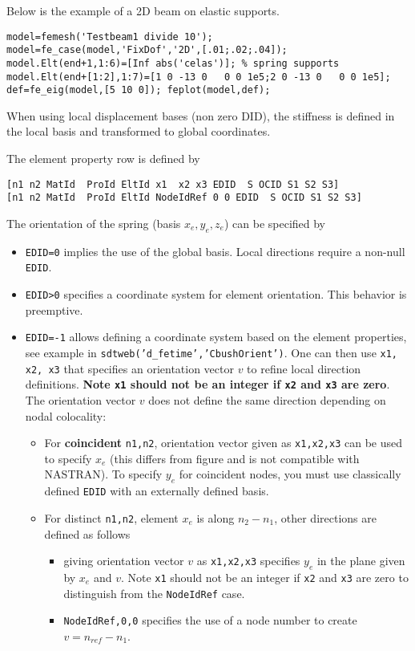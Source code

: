 Below is the example of a 2D beam on elastic supports.
\begin{verbatim}
model=femesh('Testbeam1 divide 10');
model=fe_case(model,'FixDof','2D',[.01;.02;.04]);
model.Elt(end+1,1:6)=[Inf abs('celas')]; % spring supports
model.Elt(end+[1:2],1:7)=[1 0 -13 0   0 0 1e5;2 0 -13 0   0 0 1e5];
def=fe_eig(model,[5 10 0]); feplot(model,def);
\end{verbatim}%

When using local displacement bases (non zero DID), the stiffness is defined in the local basis and transformed to global coordinates.


The element property row is defined by 

\begin{verbatim}
[n1 n2 MatId  ProId EltId x1  x2 x3 EDID  S OCID S1 S2 S3]
[n1 n2 MatId  ProId EltId NodeIdRef 0 0 EDID  S OCID S1 S2 S3]
\end{verbatim}

The orientation of the spring (basis $x_e,y_e,z_e$) can be specified by 
\begin{itemize}
\item {\tt EDID=0} implies the use of the global basis. Local directions require a non-null {\tt EDID}.
\item {\tt EDID>0} specifies a coordinate system for element orientation. This behavior is preemptive.
\item {\tt EDID=-1} allows defining a coordinate system based on the element properties, see example in {\tt sdtweb('d\_fetime','CbushOrient')}. One can then use {\tt x1, x2, x3} that specifies an  orientation vector $v$ to refine local direction definitions. {\bf Note {\tt x1} should not be an integer if {\tt x2} and {\tt x3} are zero}. The orientation vector $v$ does not define the same direction depending on nodal colocality:
\begin{itemize}
\item  For {\bf coincident} {\tt n1,n2}, orientation vector given as {\tt x1,x2,x3} can be used to specify $x_e$ (this differs from figure and is not compatible with NASTRAN). To specify $y_e$ for coincident nodes, you must use classically defined {\tt EDID} with an externally defined basis.
\item  For distinct {\tt n1,n2}, element $x_e$ is along $n_2-n_1$, other directions are defined as follows
\begin{itemize}
\item giving orientation vector $v$ as {\tt x1,x2,x3} specifies $y_e$ in the plane given by $x_e$ and $v$. Note {\tt x1} should not be an integer if {\tt x2} and {\tt x3} are zero to distinguish from the {\tt NodeIdRef} case.
\item {\tt NodeIdRef,0,0} specifies the use of a node number to create $v=n_{ref}-n_1$.
\end{itemize}
\end{itemize}
\end{itemize}


